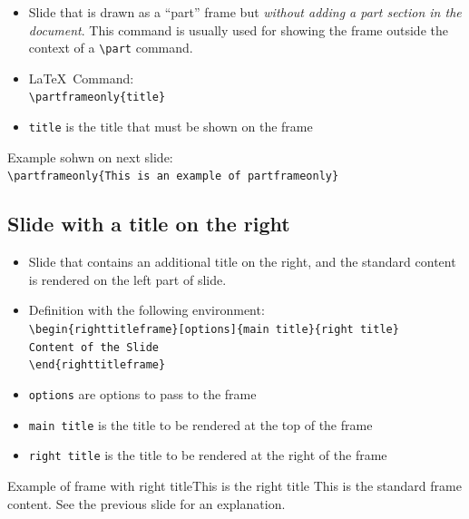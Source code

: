 \documentclass[english,sectioncirclenumberstyle]{ciadbeamer}
\begin{document}
\begin{frame}{\subsecname}
	\begin{itemize}
	\item Slide that is drawn as a ``part'' frame but \emph{without adding a part section in the document}. This command is usually used for showing the frame outside the context of a \texttt{{\textbackslash}part} command.
	\item \LaTeX\ Command:\\
		\texttt{{\textbackslash}partframeonly\{title\}}
	\item \texttt{title} is the title that must be shown on the frame
	\end{itemize}
	\vspace{1cm}
	Example sohwn on next slide: \\
	\texttt{{\textbackslash}partframeonly\{This is an example of partframeonly\}}
\end{frame}


\subsection{Slide with a title on the right}
\subsectiontableofcontentslide

\begin{frame}{\subsecname}
	\begin{itemize}
	\item Slide that contains an additional title on the right, and the standard content is rendered on the left part of slide.
	\item Definition with the following environment: \\
		\texttt{{\textbackslash}begin\{righttitleframe\}[options]\{main title\}\{right title\}} \\
		\texttt{Content of the Slide} \\
		\texttt{{\textbackslash}end\{righttitleframe\}}
	\item \texttt{options} are options to pass to the frame
	\item \texttt{main title} is the title to be rendered at the top of the frame
	\item \texttt{right title} is the title to be rendered at the right of the frame
	\end{itemize}
\end{frame}

\begin{righttitleframe}{Example of frame with right title}{This is the right title}
	This is the standard frame content. See the previous slide for an explanation.
\end{righttitleframe}
\end{document}
